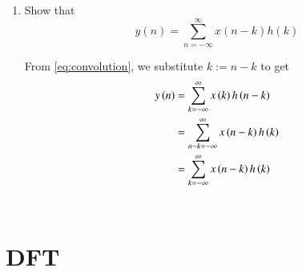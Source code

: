 \documentclass[journal,12pt,twocolumn]{IEEEtran}
\renewcommand\thesection{\arabic{section}}
\begin{document}
\begin{enumerate}[label=\thesection.\arabic*]
\item Show that
\begin{equation}
y(n) =  \sum_{n=-\infty}^{\infty}x(n-k)h(k)
\end{equation}

\solution 
From \eqref{eq:convolution}, we substitute $k := n - k$ to get
\begin{align}
y\left(n\right) &= \sum_{k=-\infty}^{\infty}x\left(k\right)h\left(n - k\right) \\
		  &= \sum_{n - k=-\infty}^{\infty}x\left(n - k\right)h\left(k\right) \\
		  &= \sum_{k=-\infty}^{\infty}x\left(n - k\right)h\left(k\right)
\end{align}
\ \\
\end{enumerate}

\section{DFT}
\end{document}
